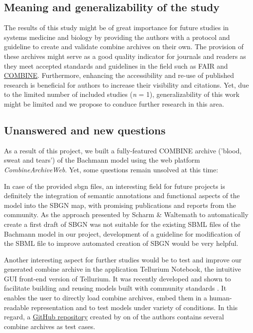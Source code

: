 \subsection*{Meaning and generalizability of the study}
The results of this study might be of great importance for future studies in systems medicine and biology by providing the authors with a protocol and guideline to create and validate \ac{combine} archives on their own. The provision of these archives might serve as a good quality indicator for journals and readers as they meet accepted standards and guidelines in the field such as FAIR \cite{wilkinson2016fair} and \hyperlink{http://co.mbine.org/}{COMBINE}. Furthermore, enhancing the accessibility and re-use of published research is beneficial for authors to increase their visibility and citations. Yet, due to the limited number of included studies (\textit{n} = 1), generalizability of this work might be limited and we propose to conduce further research in this area.

\subsection*{Unanswered and new questions}
As a result of this project, we built a fully-featured COMBINE archive ('blood, sweat and tears') of the Bachmann model \cite{bachmannmodel} using the web platform \textit{CombineArchiveWeb}. Yet, some questions remain unsolved at this time:

In case of the provided \acf{sbgn} files, an interesting field for future projects is definitely the integration of semantic annotations and functional aspects of the model into the SBGN map, with promising publications and reports from the community. As the approach presented by Scharm \& Waltemath \cite{combine} to automatically create a first draft of SBGN was not suitable for the existing SBML files of the Bachmann model in our project, development of a guideline for modification of the SBML file to improve automated creation of SBGN would be very helpful.

Another interesting aspect for further studies would be to test and improve our generated \ac{combine} archive in the application Tellurium Notebook, the intuitive GUI front-end version of Tellurium. It was recently developed and shown to facilitate building and reusing models built with community standards \cite{choi2018tellurium}. It enables the user to directly load \ac{combine} archives, embed them in a human-readable representation and to test models under variety of conditions. In this regard, a \hyperref[https://github.com/0u812/tellurium-combine-archive-test-cases]{GitHub repository} created by on of the authors contains several \ac{combine} archives as test cases.

